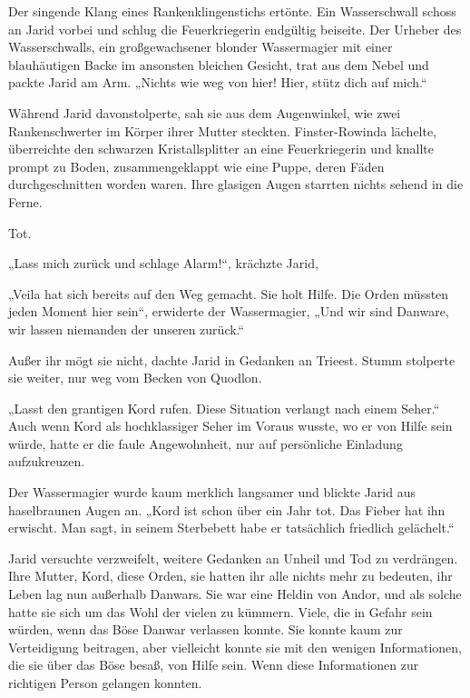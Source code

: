 Der singende Klang eines Rankenklingenstichs ertönte. Ein Wasserschwall schoss an Jarid vorbei und schlug die Feuerkriegerin endgültig beiseite. Der Urheber des Wasserschwalls, ein großgewachsener blonder Wassermagier mit einer blauhäutigen Backe im ansonsten bleichen Gesicht, trat aus dem Nebel und packte Jarid am Arm. „Nichts wie weg von hier! Hier, stütz dich auf mich.“

Während Jarid davonstolperte, sah sie aus dem Augenwinkel, wie zwei Rankenschwerter im Körper ihrer Mutter steckten. Finster-Rowinda lächelte, überreichte den schwarzen Kristallsplitter an eine Feuerkriegerin und knallte prompt zu Boden, zusammengeklappt wie eine Puppe, deren Fäden durchgeschnitten worden waren. Ihre glasigen Augen starrten nichts sehend in die Ferne.

Tot.\bigskip







„Lass mich zurück und schlage Alarm!“, krächzte Jarid,

„Veila hat sich bereits auf den Weg gemacht. Sie holt Hilfe. Die Orden müssten jeden Moment hier sein“, erwiderte der Wassermagier, „Und wir sind Danware, wir lassen niemanden der unseren zurück.“

Außer ihr mögt sie nicht, dachte Jarid in Gedanken an Trieest. Stumm stolperte sie weiter, nur weg vom Becken von Quodlon.

„Lasst den grantigen Kord rufen. Diese Situation verlangt nach einem Seher.“ Auch wenn Kord als hochklassiger Seher im Voraus wusste, wo er von Hilfe sein würde, hatte er die faule Angewohnheit, nur auf persönliche Einladung aufzukreuzen.

Der Wassermagier wurde kaum merklich langsamer und blickte Jarid aus haselbraunen Augen an. „Kord ist schon über ein Jahr tot. Das Fieber hat ihn erwischt. Man sagt, in seinem Sterbebett habe er tatsächlich friedlich gelächelt.“

Jarid versuchte verzweifelt, weitere Gedanken an Unheil und Tod zu verdrängen. Ihre Mutter, Kord, diese Orden, sie hatten ihr alle nichts mehr zu bedeuten, ihr Leben lag nun außerhalb Danwars. Sie war eine Heldin von Andor, und als solche hatte sie sich um das Wohl der vielen zu kümmern. Viele, die in Gefahr sein würden, wenn das Böse Danwar verlassen konnte. Sie konnte kaum zur Verteidigung beitragen, aber vielleicht konnte sie mit den wenigen Informationen, die sie über das Böse besaß, von Hilfe sein. Wenn diese Informationen zur richtigen Person gelangen konnten.

